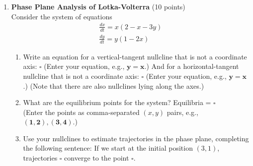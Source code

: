 \begin{enumerate}
  \item \textbf{Phase Plane Analysis of Lotka-Volterra} (10 points)\\
  Consider the system of equations
  $$
  \begin{gathered}
  \frac{d x}{d t}=x(2-x-3 y) \\
  \frac{d y}{d t}=y(1-2 x)
  \end{gathered}
  $$
  \begin{enumerate}[label=(\alph*)]
    \item Write an equation for a vertical-tangent nullcline that is not a coordinate axis:
    $\square$
    (Enter your equation, e.g., $\boldsymbol{y}=\boldsymbol{x}$.)
    And for a horizontal-tangent nullcline that is not a coordinate axis:
    $\square$
    (Enter your equation, e.g., $\boldsymbol{y}=\boldsymbol{x}$.)
    (Note that there are also nullclines lying along the axes.)
    \begin{subanswer}
    \end{subanswer}
    \item What are the equilibrium points for the system?
    Equilibria = $\square$\\
    (Enter the points as comma-separated $(x, y)$ pairs, e.g., $(\mathbf{1 , 2}),(\mathbf{3 , 4})$.)
    \begin{subanswer}
    \end{subanswer}
    \item Use your nullclines to estimate trajectories in the phase plane, completing the following sentence:
    If we start at the initial position $(3,1)$, trajectories $\square$ converge to the point $\square$.
    \begin{subanswer}
    \end{subanswer}
  \end{enumerate}


\end{enumerate}
